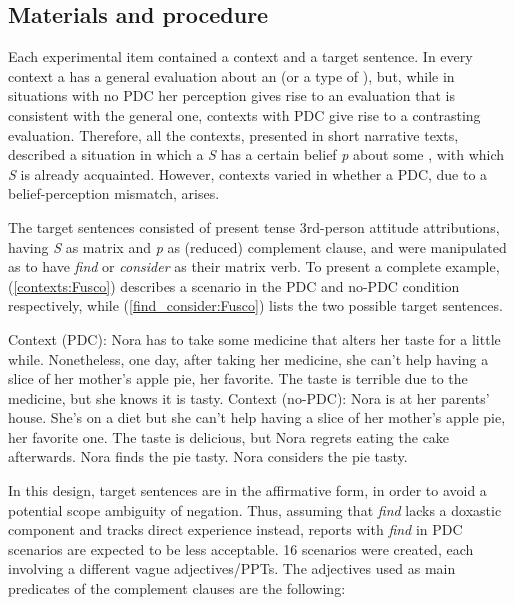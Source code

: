 \documentclass[output=paper,colorlinks,citecolor=brown]{langscibook}
\begin{document}
\subsection{Materials and procedure}
\label{sec:materials:Fusco}

Each experimental item contained a context and a target sentence. In every context a  has a general evaluation about an  (or a type of ), but, while in situations with no PDC her perception gives rise to an evaluation that is consistent with the general one, contexts with PDC give rise to a contrasting evaluation. Therefore, all the contexts, presented in short narrative texts, described a situation in which a  \textit{S} has a certain belief \textit{p} about some , with which \textit{S} is already acquainted. However, contexts varied in whether a PDC, due to a belief-perception mismatch, arises. 

The target sentences consisted of present tense 3rd-person attitude attributions, having \textit{S} as matrix  and \textit{p} as (reduced) complement clause, and were manipulated as to have \textit{find} or \textit{consider} as their matrix verb. To present a complete example, (\ref{contexts:Fusco}) describes a scenario in the PDC and no-PDC condition respectively, while (\ref{find_consider:Fusco}) lists the two possible target sentences.

\ea \label{contexts:Fusco}
\ea Context (PDC): Nora has to take some medicine that alters her taste for a little while. Nonetheless, one day, after taking her medicine, she can’t help having a slice of her mother’s apple pie, her favorite. The taste is terrible due to the medicine, but she knows it is tasty. \label{context_pdc:Fusco}
\ex Context (no-PDC): Nora is at her parents’ house. She’s on a diet but she can’t help having a slice of her mother’s apple pie, her favorite one. The taste is delicious, but Nora regrets eating the cake afterwards.
\z
\ex \label{find_consider:Fusco} \ea Nora finds the pie tasty.
\ex Nora considers the pie tasty.
\z
\z

In this design, target sentences are in the affirmative form, in order to avoid a potential scope ambiguity of negation. Thus, assuming that \textit{find} lacks a doxastic component and tracks direct experience instead, reports with \textit{find} in PDC scenarios are expected to be less acceptable. 16 scenarios were created, each involving a different vague adjectives/PPTs. The adjectives used as main predicates of the complement clauses are the following: 
\end{document}
